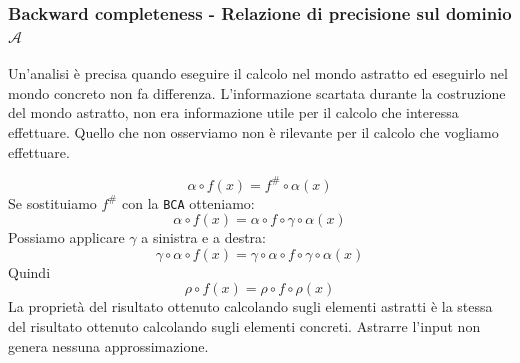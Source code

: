 \subsubsection{Backward completeness - Relazione di precisione sul dominio $\mathcal{A}$}
Un'analisi è precisa quando eseguire il calcolo nel mondo astratto ed eseguirlo nel mondo concreto 
non fa differenza. L'informazione scartata durante la costruzione del mondo astratto, non era informazione utile per il calcolo 
che interessa effettuare. Quello che non osserviamo non è rilevante 
per il calcolo che vogliamo effettuare.
\begin{figure}[H]
    \centering
\end{figure}
\[
    \alpha \circ f(x) = f^\# \circ \alpha(x) 
\]
Se sostituiamo $f^\#$ con la \texttt{BCA} otteniamo:
\[
    \alpha \circ f(x) = \alpha \circ f \circ \gamma \circ \alpha(x)
\]
Possiamo applicare $\gamma$ a sinistra e a destra:
\[
    \gamma \circ \alpha \circ f(x) = \gamma \circ \alpha \circ f \circ \gamma \circ \alpha(x)
\]
Quindi
\[
    \rho \circ f(x) = \rho \circ f \circ \rho(x)
\]
La proprietà del risultato ottenuto calcolando sugli elementi astratti è la stessa 
del risultato ottenuto calcolando sugli elementi concreti. Astrarre l'input non genera nessuna 
approssimazione.
